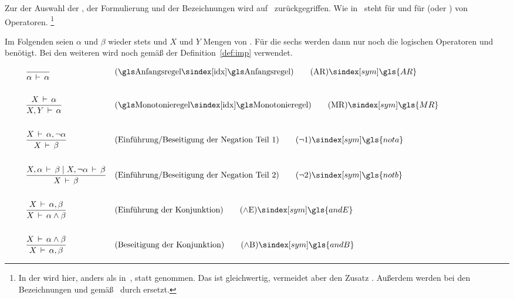 Zur der Auswahl der , der Formulierung und der Bezeichnungen wird auf~\cite{bib:Rautenberg,bib:NatuerlichesSchliessen} zurückgegriffen.
Wie in~\cite{bib:NatuerlichesSchliessen} steht  für  und  für  (oder ) von Operatoren.%
\footnote{%
	In der  wird hier, anders als in~\cite{bib:Rautenberg},  statt  genommen. Das ist gleichwertig, vermeidet aber den Zusatz .
	Außerdem werden bei den Bezeichnungen  und  gemäß~\cite{bib:NatuerlichesSchliessen} durch \forqt{$\andE$} \textbzw \forqt{$\andB$} ersetzt.
}

Im Folgenden seien $\alpha$ und $\beta$ wieder stets  und $X$ und $Y$ Mengen von .
Für die sechs  werden dann nur noch die logischen Operatoren \symqt{$\lnot$} und \symqt{$\land$} benötigt.
Bei den weiteren  wird noch \symqt{$\limp$} gemäß der Definition~\vref{def:imp} verwendet.

\begin{align}
	& \frac{}{\alpha\derive\alpha}
	& & (\text{\glsIdx{Anfangsregel}})
	\tag{\tagAR} \sym{\gls{AR}} \label{def:Anfangsregel}
	\\\\
	& \frac{X\derive\alpha}{X,Y\derive\alpha}
	& & (\text{\glsIdx{Monotonieregel}})
	\tag{\tagMR} \sym{\gls{MR}} \label{def:Monotonieregel}
	\\\\
	& \frac{X\derive\alpha,\lnot\alpha}{X\derive\beta}
	& & (\text{Einführung/Beseitigung der Negation Teil 1})
	\tag{\tagnota} \sym{\gls{nota}} \label{def:nota}
	\\\\
	& \frac{X,\alpha\derive\beta \und X,\lnot\alpha\derive\beta}{X\derive\beta}
	& & (\text{Einführung/Beseitigung der Negation Teil 2})
	\tag{\tagnotb} \sym{\gls{notb}} \label{def:notb}
	\\\\
	& \frac{X\derive\alpha,\beta}{X\derive\alpha\land\beta}
	& & (\text{Einführung der Konjunktion})
	\tag{\tagandE} \sym{\gls{andE}} \label{def:andE}
	\\\\
	& \frac{X\derive\alpha\land\beta}{X\derive\alpha,\beta}
	& & (\text{Beseitigung der Konjunktion})
	\tag{\tagandB} \sym{\gls{andB}} \label{def:andB}
	\formulatoleft
\end{align}

